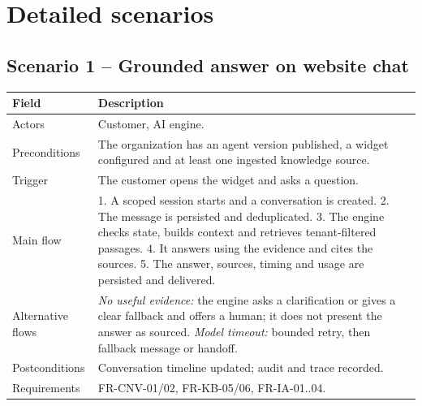 \chapter{Detailed scenarios}\label{app:scenarios}

\section{Scenario 1 -- Grounded answer on website chat}
\begin{tabular}{@{}p{3.2cm}p{12.8cm}@{}}
\toprule \textbf{Field} & \textbf{Description} \\ \midrule
Actors & Customer, AI engine. \\
Preconditions & The organization has an agent version published, a widget configured and at least one ingested knowledge source. \\
Trigger & The customer opens the widget and asks a question. \\
Main flow & 1. A scoped session starts and a conversation is created. 2. The message is persisted and deduplicated. 3. The engine checks state, builds context and retrieves tenant-filtered passages. 4. It answers using the evidence and cites the sources. 5. The answer, sources, timing and usage are persisted and delivered. \\
Alternative flows & \emph{No useful evidence:} the engine asks a clarification or gives a clear fallback and offers a human; it does not present the answer as sourced. \emph{Model timeout:} bounded retry, then fallback message or handoff. \\
Postconditions & Conversation timeline updated; audit and trace recorded. \\
Requirements & FR-CNV-01/02, FR-KB-05/06, FR-IA-01..04. \\
\bottomrule
\end{tabular}

